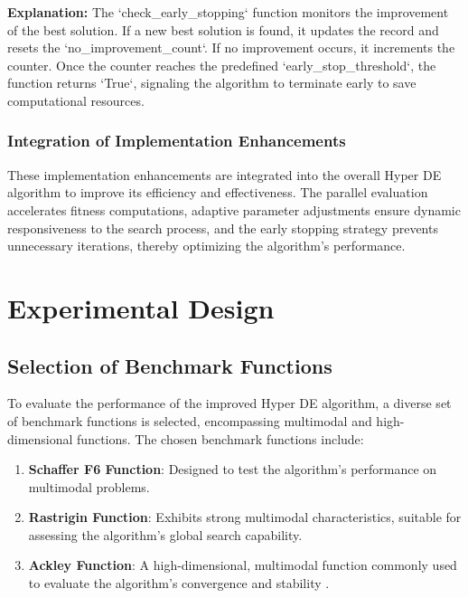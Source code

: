 \documentclass[conference]{IEEEtran}
\begin{document}
\textbf{Explanation:}  
The `check\_early\_stopping` function monitors the improvement of the best solution. If a new best solution is found, it updates the record and resets the `no\_improvement\_count`. If no improvement occurs, it increments the counter. Once the counter reaches the predefined `early\_stop\_threshold`, the function returns `True`, signaling the algorithm to terminate early to save computational resources.

\subsubsection{Integration of Implementation Enhancements}

These implementation enhancements are integrated into the overall Hyper DE algorithm to improve its efficiency and effectiveness. The parallel evaluation accelerates fitness computations, adaptive parameter adjustments ensure dynamic responsiveness to the search process, and the early stopping strategy prevents unnecessary iterations, thereby optimizing the algorithm's performance.

\section{Experimental Design}

\subsection{Selection of Benchmark Functions}

To evaluate the performance of the improved Hyper DE algorithm, a diverse set of benchmark functions is selected, encompassing multimodal and high-dimensional functions. The chosen benchmark functions include:

\begin{enumerate}
    \item \textbf{Schaffer F6 Function}: Designed to test the algorithm's performance on multimodal problems.
    \item \textbf{Rastrigin Function}: Exhibits strong multimodal characteristics, suitable for assessing the algorithm's global search capability.
    \item \textbf{Ackley Function}: A high-dimensional, multimodal function commonly used to evaluate the algorithm's convergence and stability \cite{burke2013hyper, grobler2010alternative}.
\end{enumerate}
\end{document}
